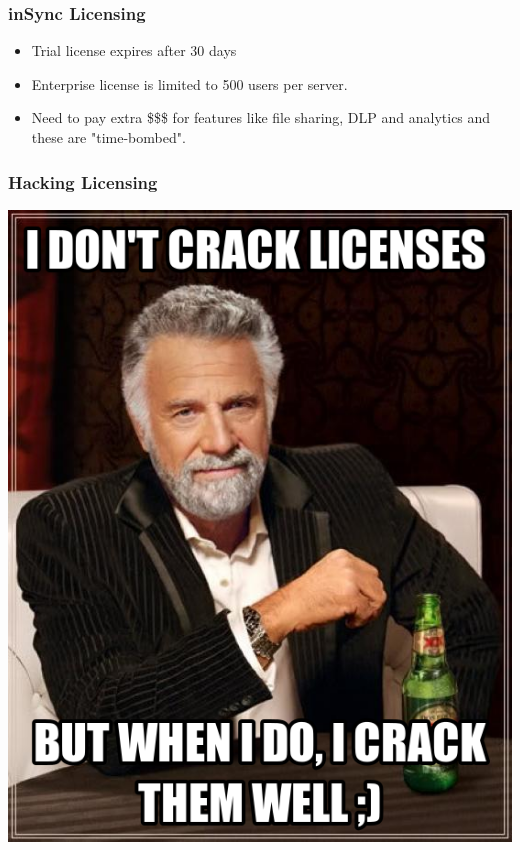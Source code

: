 \documentclass{beamer}
\begin{document}
\begin{frame}
	\frametitle{inSync Licensing}
	\begin{itemize}
		\item Trial license expires after 30 days
		\item Enterprise license is limited to 500 users per
		server.
		\item Need to pay extra \$\$\$ for features like file
		sharing, DLP and analytics and these are
		"time-bombed".
	\end{itemize}
\end{frame}

\begin{frame}
	\frametitle{Hacking Licensing}
	\begin{center}
		\includegraphics[scale=0.28]{meme-license}
	\end{center}
\end{frame}
\end{document}
